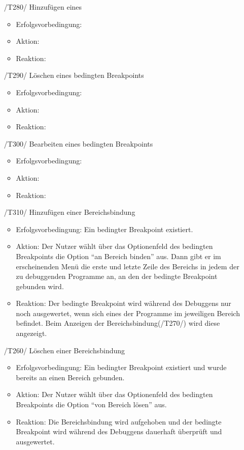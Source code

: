 \documentclass[parskip=full]{scrartcl}
\let\glsplgen\glsuseri
\begin{document}
\begin{itemize}

	\item[/T280/] Hinzufügen eines \glsplgen{bedingter Breakpoint}
		\begin{itemize}
		\item Erfolgsvorbedingung:
		\item Aktion:
		\item Reaktion:		
		\end{itemize}	
	
	\item[/T290/] Löschen eines bedingten Breakpoints
		\begin{itemize}
		\item Erfolgsvorbedingung:
		\item Aktion:
		\item Reaktion:		
		\end{itemize}	
	
	\item[/T300/] Bearbeiten eines bedingten Breakpoints
		\begin{itemize}
		\item Erfolgsvorbedingung:
		\item Aktion:
		\item Reaktion:		
		\end{itemize}	
	
	\item[/T310/] Hinzufügen einer Bereichsbindung
		\begin{itemize}
		\item Erfolgsvorbedingung: Ein bedingter Breakpoint existiert.
		\item Aktion: Der Nutzer wählt über das Optionenfeld des bedingten Breakpoints die Option \enquote{an Bereich binden} aus. Dann gibt er im erscheinenden Menü die erste und letzte Zeile des Bereichs in jedem der zu debuggenden Programme an, an den der bedingte Breakpoint gebunden wird. 
		\item Reaktion:	Der bedingte Breakpoint wird während des Debuggens nur noch ausgewertet, wenn sich eines der Programme im jeweiligen Bereich befindet. Beim Anzeigen der Bereichsbindung(/T270/) wird diese angezeigt. 
		\end{itemize}		
	
	\item[/T260/] Löschen einer Bereichsbindung
		\begin{itemize}
		\item Erfolgsvorbedingung: Ein bedingter Breakpoint existiert und wurde bereits an einen Bereich gebunden. 
		\item Aktion: Der Nutzer wählt über das Optionenfeld des bedingten Breakpoints die Option \enquote{von Bereich lösen} aus.
		\item Reaktion:	Die Bereichsbindung wird aufgehoben und der bedingte Breakpoint wird während des Debuggens dauerhaft überprüft und ausgewertet.
		\end{itemize}	
	

\end{itemize}
\end{document}
